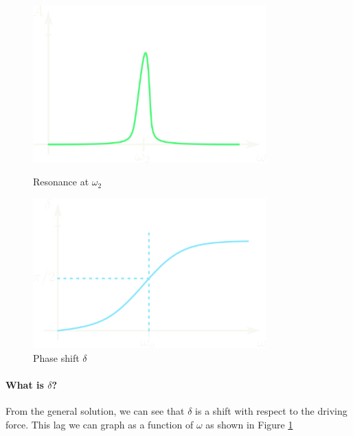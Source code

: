 \documentclass[../main.tex]{subfiles}
\begin{document}
\begin{figure}
    \centering
    \begin{minipage}{0.5\textwidth}
        \centering
        \includegraphics[width=0.8\textwidth]{amplitude.png}
        \caption{Resonance at $\omega_2$}
        \label{fig:resonance}
        \end{minipage}%
    \begin{minipage}{0.5\textwidth}
        \centering
        \includegraphics[width=0.8\textwidth]{delta.png}
        \caption{Phase shift $\delta$}
        \label{fig:phase}    
    \end{minipage} 
\end{figure}
\paragraph*{What is $\delta$?} From the general solution, we can see that $\delta$ is a shift with
respect to the driving force. This lag we can graph as a function of $\omega$ as shown in Figure
\ref{fig:phase}
\end{document}
